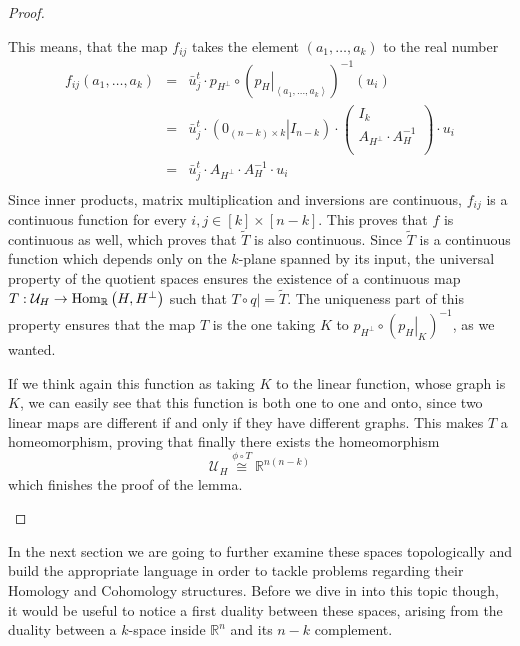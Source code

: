\begin{proof}
\begin{b_item}
This means, that the map $f_{ij}$ takes the element $\left(a_1,\ldots,a_k\right)$ to the real number
$$\begin{array}{rcl}f_{ij}\left(a_1,\ldots,a_k\right)
&=&\bar{u}_j^t\cdot p_{H^{\perp}}\circ\left(\left.p_H\right|_{\left<a_1,\ldots,a_k\right>}\right)^{-1}(u_i)\\
&=&\bar{u}_j^t\cdot\left(\left.0_{(n-k)\times k}\right|I_{n-k}\right)\cdot\left(\begin{array}{c}I_k\\\hline A_{H^{\perp}}\cdot A_H^{-1}\\\end{array}\right)\cdot u_i\\
&=&\bar{u}_j^t\cdot A_{H^{\perp}}\cdot A_H^{-1}\cdot u_i\\
\end{array}$$
Since inner products, matrix multiplication and inversions are continuous, $f_{ij}$ is a continuous function for every $i,j\in[k]\times[n-k]$. This proves that $f$ is continuous as well, which proves that $\tilde T$ is also continuous. Since $\tilde T$ is a continuous function which depends only on the $k$-plane spanned by its input, the universal property of the quotient spaces ensures the existence of a continuous map $T:\mathcal{U}_H\to\mathrm{Hom}_{\mathbb{R}}\left(H,H^{\perp}\right)$ such that $T\circ \left.q\right|=\tilde T$. The uniqueness part of this property ensures that the map $T$ is the one taking $K$ to $p_{H^{\perp}}\circ\left(\left.p_H\right|_K\right)^{-1}$, as we wanted.

If we think again this function as taking $K$ to the linear function, whose graph is $K$, we can easily see that this function is both one to one and onto, since two linear maps are different if and only if they have different graphs. This makes $T$ a homeomorphism, proving that finally there exists the homeomorphism
$$\mathcal{U}_H\overset{\phi\circ T}{\cong}\mathbb{R}^{n(n-k)}$$
which finishes the proof of the lemma.
\end{b_item}
\end{proof}

In the next section we are going to further examine these spaces topologically and build the appropriate language in order to tackle problems regarding their Homology and Cohomology structures. Before we dive in into this topic though, it would be useful to notice a first duality between these spaces, arising from the duality between a $k$-space inside $\mathbb{R}^n$ and its $n-k$ complement.

